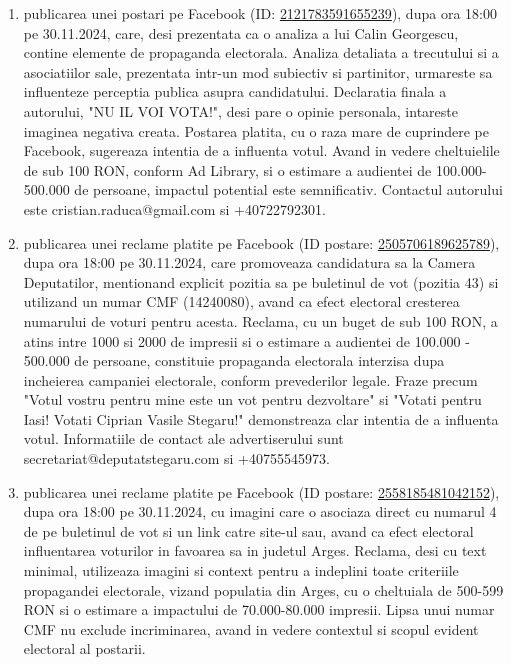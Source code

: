 \documentclass[a4paper,12pt]{article}
\begin{document}
\begin{enumerate}[leftmargin=*, label=\arabic*.)]
    \item publicarea unei postari pe Facebook (ID: \href{https://www.facebook.com/ads/library/?id=2121783591655239}{2121783591655239}), dupa ora 18:00 pe 30.11.2024, care, desi prezentata ca o analiza a lui Calin Georgescu, contine elemente de propaganda electorala.  Analiza detaliata a trecutului si a asociatiilor sale, prezentata intr-un mod subiectiv si partinitor, urmareste sa influenteze perceptia publica asupra candidatului.  Declaratia finala a autorului, "NU IL VOI VOTA!", desi pare o opinie personala, intareste imaginea negativa creata.  Postarea platita, cu o raza mare de cuprindere pe Facebook, sugereaza intentia de a influenta votul.  Avand in vedere cheltuielile de sub 100 RON, conform Ad Library, si o estimare a audientei de 100.000-500.000 de persoane, impactul potential este semnificativ.  Contactul autorului este cristian.raduca@gmail.com si +40722792301.
    \item publicarea unei reclame platite pe Facebook (ID postare: \href{https://www.facebook.com/ads/library/?id=2505706189625789}{2505706189625789}), dupa ora 18:00 pe 30.11.2024,  care promoveaza candidatura sa la Camera Deputatilor, mentionand explicit pozitia sa pe buletinul de vot (pozitia 43) si utilizand un numar CMF (14240080), avand ca efect electoral cresterea numarului de voturi pentru acesta. Reclama, cu un buget de sub 100 RON, a atins intre 1000 si 2000 de impresii si o estimare a audientei de 100.000 - 500.000 de persoane,  constituie propaganda electorala interzisa dupa incheierea campaniei electorale, conform prevederilor legale.  Fraze precum "Votul vostru pentru mine este un vot pentru dezvoltare" si "Votati pentru Iasi! Votati Ciprian Vasile Stegaru!" demonstreaza clar intentia de a influenta votul.  Informatiile de contact ale advertiserului sunt secretariat@deputatstegaru.com si +40755545973.
    \item publicarea unei reclame platite pe Facebook (ID postare: \href{https://www.facebook.com/ads/library/?id=2558185481042152}{2558185481042152}), dupa ora 18:00 pe 30.11.2024, cu imagini care o asociaza direct cu numarul 4 de pe buletinul de vot si un link catre site-ul sau, avand ca efect electoral influentarea voturilor in favoarea sa in judetul Arges. Reclama, desi cu text minimal, utilizeaza imagini si context pentru a indeplini toate criteriile propagandei electorale, vizand populatia din Arges, cu o cheltuiala de 500-599 RON si o estimare a impactului de 70.000-80.000 impresii.  Lipsa unui numar CMF nu exclude incriminarea, avand in vedere contextul si scopul evident electoral al postarii.

\end{enumerate}
\end{document}
